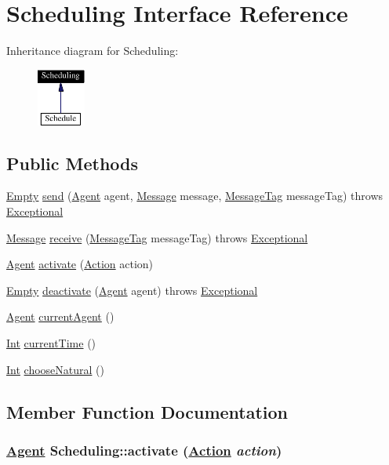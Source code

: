 \hypertarget{interfaceScheduling}{
\section{Scheduling  Interface Reference}
\label{interfaceScheduling}
}
Inheritance diagram for Scheduling:\begin{figure}[H]
\begin{center}
\leavevmode
\includegraphics[width=45pt]{interfaceScheduling__inherit__graph}
\end{center}
\end{figure}
\subsection*{Public Methods}
\begin{CompactItemize}
\item 
\hyperlink{interfaceEmpty}{Empty} \hyperlink{interfaceScheduling_a0}{send} (\hyperlink{interfaceAgent}{Agent} agent, \hyperlink{interfaceMessage}{Message} message, \hyperlink{interfaceMessageTag}{Message\-Tag} message\-Tag) throws \hyperlink{classExceptional}{Exceptional}
\item 
\hyperlink{interfaceMessage}{Message} \hyperlink{interfaceScheduling_a1}{receive} (\hyperlink{interfaceMessageTag}{Message\-Tag} message\-Tag) throws \hyperlink{classExceptional}{Exceptional}
\item 
\hyperlink{interfaceAgent}{Agent} \hyperlink{interfaceScheduling_a2}{activate} (\hyperlink{interfaceAction}{Action} action)
\item 
\hyperlink{interfaceEmpty}{Empty} \hyperlink{interfaceScheduling_a3}{deactivate} (\hyperlink{interfaceAgent}{Agent} agent) throws \hyperlink{classExceptional}{Exceptional}
\item 
\hyperlink{interfaceAgent}{Agent} \hyperlink{interfaceScheduling_a4}{current\-Agent} ()
\item 
\hyperlink{interfaceInt}{Int} \hyperlink{interfaceScheduling_a5}{current\-Time} ()
\item 
\hyperlink{interfaceInt}{Int} \hyperlink{interfaceScheduling_a6}{choose\-Natural} ()
\end{CompactItemize}


\subsection{Member Function Documentation}
\hypertarget{interfaceScheduling_a2}{
\subsubsection[activate]{\setlength{\rightskip}{0pt plus 5cm}\hyperlink{interfaceAgent}{Agent} Scheduling::activate (\hyperlink{interfaceAction}{Action} {\em action})}}
\label{interfaceScheduling_a2}




